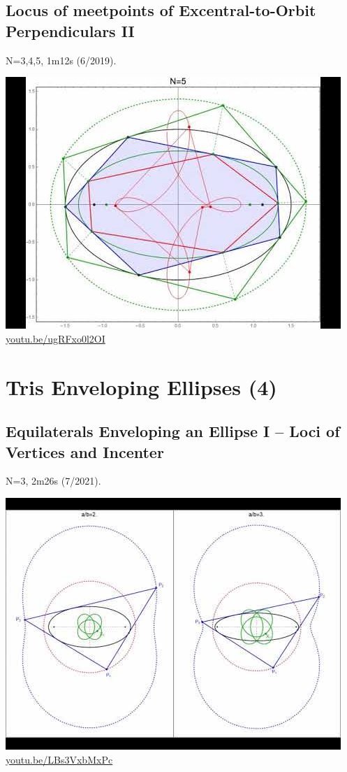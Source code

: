 \documentclass[12pt]{amsart}
\begin{document}
\subsection{Locus of meetpoints of Excentral-to-Orbit Perpendiculars II}
\label{vid:ugRFxo0l2OI}
\noindent N=3,4,5, 1m12s (6/2019). 
\begin{center}\includegraphics[width=.5\textwidth]{pics/ugRFxo0l2OI.jpg} \\ 
\href{https://youtu.be/ugRFxo0l2OI}{\url{youtu.be/ugRFxo0l2OI}}\end{center}
% 


\section{Tris Enveloping Ellipses (4)}

\subsection{Equilaterals Enveloping an Ellipse I -- Loci of Vertices and Incenter}
\label{vid:LBs3VxbMxPc}
\noindent N=3, 2m26s (7/2021). 
\begin{center}\includegraphics[width=.5\textwidth]{pics/LBs3VxbMxPc.jpg} \\ 
\href{https://youtu.be/LBs3VxbMxPc}{\url{youtu.be/LBs3VxbMxPc}}\end{center}
% 
\end{document}
